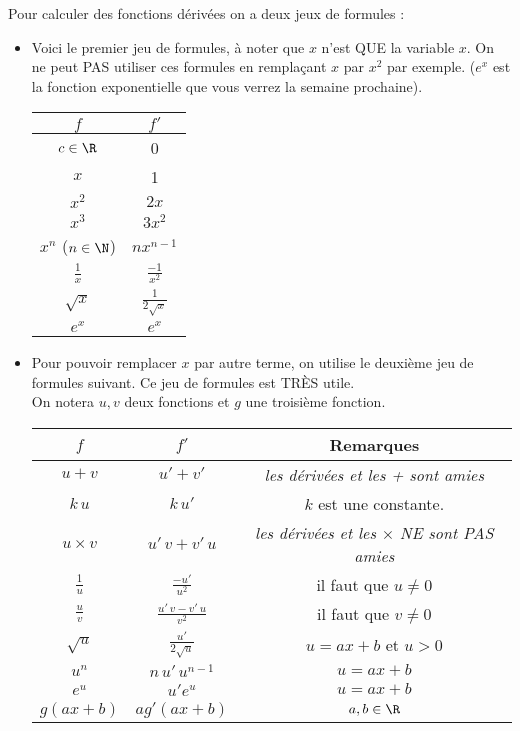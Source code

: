 \documentclass[12pt,fleqn]{report} %
\begin{document}
Pour calculer des fonctions dérivées on a deux jeux de formules : \begin{itemize}
	\item Voici le premier jeu de formules, à noter que $x$ n'est QUE la variable $x$. On ne peut PAS utiliser ces formules en remplaçant $x$ par $x^2$ par exemple. ($e^x$ est la fonction exponentielle que vous verrez la semaine prochaine).
	\begin{center}
		\begin{tabular}{|c|c|}
			\hline
			$f$ & $f'$ \\ \hline
			$c \in \R$ & 0 \\ \hline
			$x$ & 1 \\ \hline
			$x^2$ & $2x$ \\ \hline
			$x^3$ & $3 x^2$ \\ \hline
			$x^n$ ($n\in \N$) & $n x^{n-1}$ \\ \hline
			$\frac{1}{x}$ & $\frac{-1}{x^2}$ \\ \hline
			$\sqrt{x}$ & $\frac{1}{2 \sqrt{x}}$ \\ \hline
			$e^x$ & $e^x$ \\ \hline
		\end{tabular}
	\end{center}
	
	\item Pour pouvoir remplacer $x$ par autre terme, on utilise le deuxième jeu de formules suivant. Ce jeu de formules est TRÈS utile.\\ On notera $u,v$ deux fonctions et $g$ une troisième fonction.
	\begin{center}
		\begin{tabular}{|c|c|c|}
			\hline
			$f$ & $f'$ & Remarques \\ \hline
			$u + v$ & $u' + v'$ & \textit{les dérivées et les + sont amies} \\ \hline
			$ k \, u $ & $k \, u'$ & $k$ est une constante. \\ \hline
			$ u \times v $  & $u'\,v + v'\,u$ & \textit{les dérivées et les $\times$ NE sont PAS amies} \\ \hline
			$\frac{1}{u}$ & $\frac{-u'}{u^2}$ & il faut que $u \neq 0$ \\ \hline
			$\frac{u}{v}$ & $\frac{u'\, v - v'\,u}{v^2}$ & il faut que $v\neq 0$ \\ \hline
			$\sqrt{u}$ & $\frac{u'}{2 \sqrt{u}}$ & $u = ax +b$ et $u>0$ \\ \hline
			$u^n$ & $n \, u' \, u^{n-1}$ & $u = ax +b$  \\ \hline
			$e^u$ & $u' e^u$ & $u = ax +b$ \\ \hline
			$g(ax + b)$ & $a g'(ax+b)$ & $a,b \in \R$ \\ \hline
		\end{tabular}
	\end{center}
	

\end{itemize}
\end{document}

